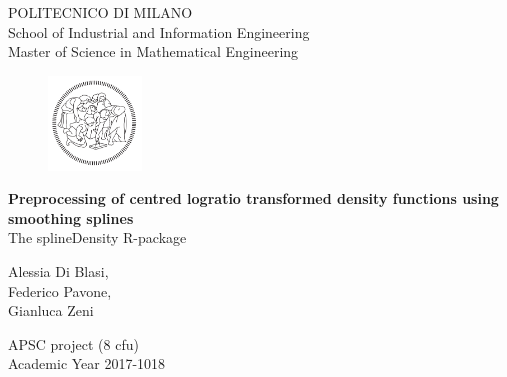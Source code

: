 \thispagestyle{empty}

\vspace*{-1.5cm} \bfseries{
\begin{center}
  \large
  POLITECNICO DI MILANO\\
  \normalsize
  School of Industrial and Information Engineering\\
  Master of Science in Mathematical Engineering\\
  \begin{figure}[htbp]
    \begin{center}
      \includegraphics[width=2.5cm]{./pictures/logopoli.png}
    \end{center}
  \end{figure}
  \vspace*{1.5cm} \LARGE



  \textbf{Preprocessing of centred logratio transformed density functions using smoothing splines}\\



  \vspace*{.75truecm} \Large
  The splineDensity R-package \\
  
  \vspace*{3.75truecm} \large
  
    Alessia Di Blasi,\\
    Federico Pavone,\\
    Gianluca Zeni
  
  
  \vspace*{2.75cm} \large

  APSC project (8 cfu) \\

  \vspace*{1.0truecm} \large
  Academic Year 2017-1018
  
\end{center} 
}
